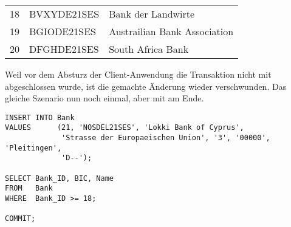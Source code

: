           \begin{center}
            \begin{small}
              \tablehead{}
              \begin{msoraclesql}
                \begin{supertabular}{rll}
                  18 & BVXYDE21SES & Bank der Landwirte \\
                  19 & BGIODE21SES & Austrailian Bank Association \\
                  20 & DFGHDE21SES & South Africa Bank \\
                \end{supertabular}
              \end{msoraclesql}
            \end{small}
          \end{center}
          Weil vor dem Absturz der Client-Anwendung die Transaktion nicht mit
          \COMMIT{} abgeschlossen wurde, ist die gemachte Änderung wieder
          verschwunden. Das gleiche Szenario nun noch einmal, aber mit \COMMIT{}
          am Ende.
          \begin{lstlisting}[language=oracle_sql,label=sql07_26]
INSERT INTO Bank
VALUES      (21, 'NOSDEL21SES', 'Lokki Bank of Cyprus',
             'Strasse der Europaeischen Union', '3', '00000', 'Pleitingen',
             'D--');

SELECT Bank_ID, BIC, Name
FROM   Bank
WHERE  Bank_ID >= 18;

COMMIT;
          \end{lstlisting}
